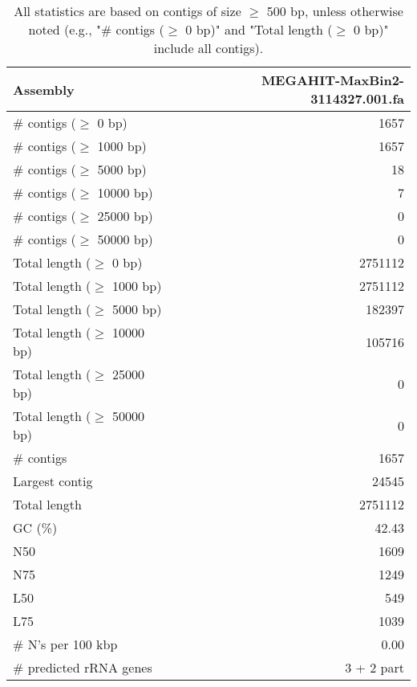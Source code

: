 \documentclass[12pt,a4paper]{article}
\begin{document}
\begin{table}[ht]
\begin{center}
\caption{All statistics are based on contigs of size $\geq$ 500 bp, unless otherwise noted (e.g., "\# contigs ($\geq$ 0 bp)" and "Total length ($\geq$ 0 bp)" include all contigs).}
\begin{tabular}{|l*{1}{|r}|}
\hline
Assembly & MEGAHIT-MaxBin2-3114327.001.fa \\ \hline
\# contigs ($\geq$ 0 bp) & 1657 \\ \hline
\# contigs ($\geq$ 1000 bp) & 1657 \\ \hline
\# contigs ($\geq$ 5000 bp) & 18 \\ \hline
\# contigs ($\geq$ 10000 bp) & 7 \\ \hline
\# contigs ($\geq$ 25000 bp) & 0 \\ \hline
\# contigs ($\geq$ 50000 bp) & 0 \\ \hline
Total length ($\geq$ 0 bp) & 2751112 \\ \hline
Total length ($\geq$ 1000 bp) & 2751112 \\ \hline
Total length ($\geq$ 5000 bp) & 182397 \\ \hline
Total length ($\geq$ 10000 bp) & 105716 \\ \hline
Total length ($\geq$ 25000 bp) & 0 \\ \hline
Total length ($\geq$ 50000 bp) & 0 \\ \hline
\# contigs & 1657 \\ \hline
Largest contig & 24545 \\ \hline
Total length & 2751112 \\ \hline
GC (\%) & 42.43 \\ \hline
N50 & 1609 \\ \hline
N75 & 1249 \\ \hline
L50 & 549 \\ \hline
L75 & 1039 \\ \hline
\# N's per 100 kbp & 0.00 \\ \hline
\# predicted rRNA genes & 3 + 2 part \\ \hline
\end{tabular}
\end{center}
\end{table}
\end{document}
